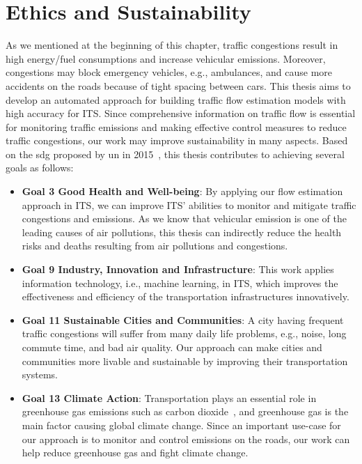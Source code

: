 \documentclass[english]{kththesis}
\begin{document}
\section{Ethics and Sustainability}
\label{sec:ehicsAndSustainability}

As we mentioned at the beginning of this chapter, traffic congestions result in high energy/fuel consumptions and increase vehicular emissions. Moreover, congestions may block emergency vehicles, e.g., ambulances, and cause more accidents on the roads because of tight spacing between cars. This thesis aims to develop an automated approach for building traffic flow estimation models with high accuracy for ITS. Since comprehensive information on traffic flow is essential for monitoring traffic emissions and making effective control measures to reduce traffic congestions, our work may improve sustainability in many aspects. Based on the \gls{sdg} proposed by \gls{un} in 2015~\cite{united_nations_sdg}, this thesis contributes to achieving several goals as follows:

\begin{itemize}
    \item \textbf{Goal 3 Good Health and Well-being}: By applying our flow estimation approach in ITS, we can improve ITS' abilities to monitor and mitigate traffic congestions and emissions. As we know that vehicular emission is one of the leading causes of air pollutions, this thesis can indirectly reduce the health risks and deaths resulting from air pollutions and congestions.
    \item \textbf{Goal 9 Industry, Innovation and Infrastructure}: This work applies information technology, i.e., machine learning, in ITS, which improves the effectiveness and efficiency of the transportation infrastructures innovatively.
    \item \textbf{Goal 11 Sustainable Cities and Communities}: A city having frequent traffic congestions will suffer from many daily life problems, e.g., noise, long commute time, and bad air quality. Our approach can make cities and communities more livable and sustainable by improving their transportation systems.
    \item \textbf{Goal 13 Climate Action}: Transportation plays an essential role in greenhouse gas emissions such as carbon dioxide~\cite{barth_co2}, and greenhouse gas is the main factor causing global climate change. Since an important use-case for our approach is to monitor and control emissions on the roads, our work can help reduce greenhouse gas and fight climate change.
\end{itemize}
\end{document}
